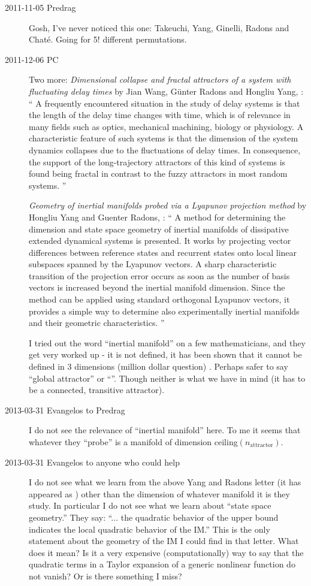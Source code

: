 \begin{description}
\item[2011-11-05 Predrag] Gosh, I've never noticed this one:
Takeuchi, Yang, Ginelli, Radons and Chat\'{e}.
Going for 5! different permutations.

\item[2011-12-06 PC] Two more:
\emph{Dimensional collapse and fractal attractors of a system with fluctuating
 delay times}
by Jian Wang, G\"unter Radons and Hongliu Yang,
:
``
 A frequently encountered situation in the study of delay systems is that the
length of the delay time changes with time, which is of relevance in many
fields such as optics, mechanical machining, biology or physiology. A
characteristic feature of such systems is that the dimension of the system
dynamics collapses due to the fluctuations of delay times. In consequence, the
support of the long-trajectory attractors of this kind of systems is found
being fractal in contrast to the fuzzy attractors in most random systems.
''

\emph{Geometry of inertial manifolds probed via a Lyapunov projection method}
by Hongliu Yang and Guenter Radons, :
``
A method for determining the dimension and state space geometry of
inertial manifolds of dissipative extended dynamical systems is
presented. It works by projecting vector differences between reference
states and recurrent states onto local linear subspaces spanned by the
Lyapunov vectors. A sharp characteristic transition of the projection
error occurs as soon as the number of basis vectors is increased beyond
the inertial manifold dimension. Since the method can be applied using
standard orthogonal Lyapunov vectors, it provides a simple way to
determine also experimentally inertial manifolds and their geometric
characteristics.
''

I tried out the word ``inertial manifold'' on a few mathematicians, and
they get very worked up - it is not defined, it has been shown that it
cannot be defined in 3 dimensions (million dollar question) \etc. Perhaps
safer to say ``global attractor'' or ``{\nws}''. Though neither is what
we have in mind (it has to be a connected, transitive attractor).

\item[2013-03-31 Evangelos to Predrag] I do not see the relevance of
``inertial manifold'' here. To me it seems that whatever they ``probe'' is
a manifold of dimension ceiling$(n_{\mathrm{attractor}})$.

\item[2013-03-31 Evangelos to anyone who could help]
I do not see what we learn from the above Yang and Radons
letter (it has appeared as ) other than the dimension of whatever
manifold it is they study. In particular I do not see what we learn about ``state space
geometry.'' They say: ``... the quadratic behavior of the upper bound
indicates the local quadratic behavior of the IM.'' This is the only statement
about the geometry of the IM I could find in that letter. What does it mean?
Is it a very expensive (computationally) way to say
that the quadratic terms in a Taylor expansion of a generic nonlinear function
do not vanish? Or is there something I miss?


\end{description}
